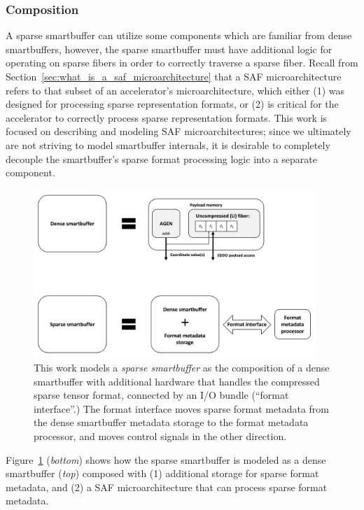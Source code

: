\subsubsection{Composition}
\label{sec:composition}

A sparse smartbuffer can utilize some components which are familiar from dense smartbuffers\cite{buffet}\cite{sparseloop}, however, the sparse smartbuffer must have additional logic for operating on sparse fibers in order to correctly traverse a sparse fiber. Recall from Section~\ref{sec:what_is_a_saf_microarchitecture} that a SAF microarchitecture refers to that subset of an accelerator's microarchitecture, which either (1) was designed for processing sparse representation formats, or (2) is critical for the accelerator to correctly process sparse representation formats. This work is focused on describing and modeling SAF microarchitectures; since we ultimately are not striving to model smartbuffer internals, it is desirable to completely decouple the smartbuffer's sparse format processing logic into a separate component.

\begin{figure}[ht]
    \centering
    \includegraphics[width=0.95\textwidth]{figures/dense_smartbuffer_composition.png}
    \caption{This work models a \textit{sparse smartbuffer} as the composition of a dense smartbuffer with additional hardware that handles the compressed sparse tensor format, connected by an I/O bundle (``format interface''.) The format interface moves sparse format metadata from the dense smartbuffer metadata storage to the format metadata processor, and moves control signals in the other direction.}
    \label{fig:dense_smartbuffer_composition}
\end{figure}

Figure~\ref{fig:dense_smartbuffer_composition} (\textit{bottom}) shows how the sparse smartbuffer is modeled as a dense smartbuffer (\textit{top}) composed with (1) additional storage for sparse format metadata, and (2) a SAF microarchitecture that can process sparse format metadata. 

